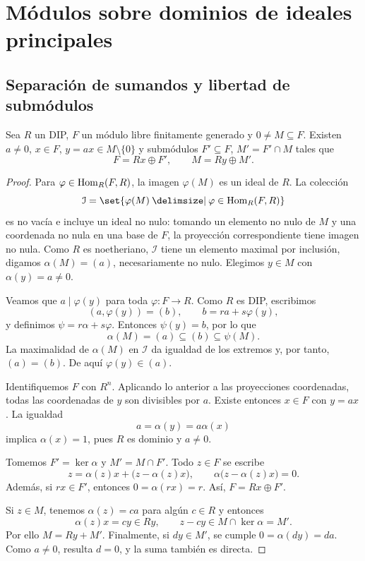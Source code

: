 \section{Módulos sobre dominios de ideales principales}\label{sec:modulos-principales}

\subsection{Separación de sumandos y libertad de submódulos}\label{tema:20-3-2}\label{tema:21-1-1}
\begin{lema}\label{lema:C20-separacion}
Sea $R$ un DIP, $F$ un módulo libre finitamente generado y $0\ne M\subseteq F$. Existen $a\ne0$, $x\in F$, $y=ax\in M\setminus\{0\}$ y submódulos $F'\subseteq F$, $M'=F'\cap M$ tales que
\[
F=Rx\oplus F',\qquad M=Ry\oplus M'.
\]
\end{lema}
\begin{proof}
Para $\varphi\in\operatorname{Hom}_R(F,R)$, la imagen $\varphi(M)$ es un ideal de $R$. La colección
\[
\mathcal I=\set{\varphi(M)\given \varphi\in\Hom_R(F,R)}
\]
es no vacía e incluye un ideal no nulo: tomando un elemento no nulo de $M$ y una coordenada no nula en una base de $F$, la proyección correspondiente tiene imagen no nula. Como $R$ es noetheriano, $\mathcal I$ tiene un elemento maximal por inclusión, digamos $\alpha(M)=(a)$, necesariamente no nulo. Elegimos $y\in M$ con $\alpha(y)=a\ne0$.

Veamos que $a\mid\varphi(y)$ para toda $\varphi:F\to R$. Como $R$ es DIP, escribimos
\[
(a,\varphi(y))=(b),\qquad b=ra+s\varphi(y),
\]
y definimos $\psi=r\alpha+s\varphi$. Entonces $\psi(y)=b$, por lo que
\[
\alpha(M)=(a)\subseteq(b)\subseteq\psi(M).
\]
La maximalidad de $\alpha(M)$ en $\mathcal I$ da igualdad de los extremos y, por tanto, $(a)=(b)$. De aquí $\varphi(y)\in(a)$.

Identifiquemos $F$ con $R^n$. Aplicando lo anterior a las proyecciones coordenadas, todas las coordenadas de $y$ son divisibles por $a$. Existe entonces $x\in F$ con $y=ax$. La igualdad
\[
a=\alpha(y)=a\alpha(x)
\]
implica $\alpha(x)=1$, pues $R$ es dominio y $a\ne0$.

Tomemos $F'=\ker\alpha$ y $M'=M\cap F'$. Todo $z\in F$ se escribe
\[
z=\alpha(z)x+\bigl(z-\alpha(z)x\bigr),\qquad
\alpha\bigl(z-\alpha(z)x\bigr)=0.
\]
Además, si $rx\in F'$, entonces $0=\alpha(rx)=r$. Así, $F=Rx\oplus F'$.

Si $z\in M$, tenemos $\alpha(z)=ca$ para algún $c\in R$ y entonces
\[
\alpha(z)x=cy\in Ry,\qquad z-cy\in M\cap\ker\alpha=M'.
\]
Por ello $M=Ry+M'$. Finalmente, si $dy\in M'$, se cumple $0=\alpha(dy)=da$. Como $a\ne0$, resulta $d=0$, y la suma también es directa.
\end{proof}


